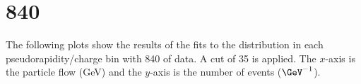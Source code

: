 
\clearpage

\section{\unit{840}{\invpb}}
The following plots show the results of the fits to the \ETm distribution in
each pseudorapidity/charge bin with \unit{840}{\invpb} of data. A \pT cut of
\unit{35}{\GeV} is applied. The $x$-axis is the particle flow \ETm (GeV) and the
$y$-axis is the number of events ($\GeV^{-1}$).

